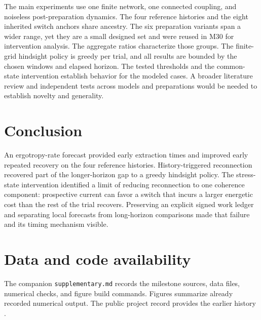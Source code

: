 \documentclass[11pt,a4paper]{article}
\begin{document}
The main experiments use one finite network, one connected coupling, and noiseless post-preparation dynamics. The four reference histories and the eight inherited switch anchors share ancestry. The six preparation variants span a wider range, yet they are a small designed set and were reused in M30 for intervention analysis. The aggregate ratios characterize those groups. The finite-grid hindsight policy is greedy per trial, and all results are bounded by the chosen windows and elapsed horizon. The tested thresholds and the common-state intervention establish behavior for the modeled cases. A broader literature review and independent tests across models and preparations would be needed to establish novelty and generality.

\section{Conclusion}

An ergotropy-rate forecast provided early extraction times and improved early repeated recovery on the four reference histories. History-triggered reconnection recovered part of the longer-horizon gap to a greedy hindsight policy. The stress-state intervention identified a limit of reducing reconnection to one coherence component: prospective current can favor a switch that incurs a larger energetic cost than the rest of the trial recovers. Preserving an explicit signed work ledger and separating local forecasts from long-horizon comparisons made that failure and its timing mechanism visible.

\section*{Data and code availability}

The companion \texttt{supplementary.md} records the milestone sources, data files, numerical checks, and figure build commands. Figures summarize already recorded numerical output. The public project record provides the earlier history \cite{project}.
\end{document}
